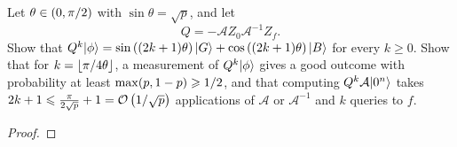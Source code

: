 \begin{exercisebox}
\begin{exercise}\label{ex:ampamp-1008}\label{thm:ampamp-1008}
    Let $\theta \in (0, \pi/2)$ with $\sin\theta = \sqrt{p}$, and let
    \[Q = -\mathcal{A} Z_0 \mathcal{A}^{-1} Z_f.\]
    Show that
    $Q^k\lvert \phi \rangle = \sin\left((2k+1)\theta\right)\lvert G \rangle + \cos\left((2k+1)\theta\right)\lvert B \rangle$
    for every $k \geq 0$. Show that for $k = \floor{\sfrac{\pi}{4\theta}}$, a measurement of
    $Q^k\lvert \phi \rangle$ gives a good outcome with probability at least $\max(p, 1 - p) \geqslant 1/2$,
    and that computing $Q^k \mathcal{A}\lvert 0^n \rangle$ takes
    $2k + 1 \leqslant \frac{\pi}{2\sqrt{p}} + 1 = \mathcal{O}\left(1/\sqrt{p}\right)$ applications of $\mathcal{A}$ or
    $\mathcal{A}^{-1}$ and $k$ queries to $f$.
\end{exercise}
\tcblower
\begin{proof}
%

\end{proof}
\end{exercisebox}

